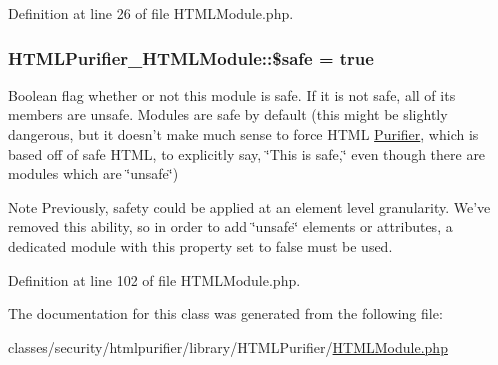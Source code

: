 Definition at line 26 of file H\+T\+M\+L\+Module.\+php.

\hypertarget{classHTMLPurifier__HTMLModule_a2607fc85f803afa801cf1904300644b9}{
\subsubsection[{\$safe}]{\setlength{\rightskip}{0pt plus 5cm}H\+T\+M\+L\+Purifier\+\_\+\+H\+T\+M\+L\+Module\+::\$safe = true}}\label{classHTMLPurifier__HTMLModule_a2607fc85f803afa801cf1904300644b9}
Boolean flag whether or not this module is safe. If it is not safe, all of its members are unsafe. Modules are safe by default (this might be slightly dangerous, but it doesn't make much sense to force H\+T\+M\+L \hyperlink{classPurifier}{Purifier}, which is based off of safe H\+T\+M\+L, to explicitly say, \char`\"{}\+This is safe,\char`\"{} even though there are modules which are \char`\"{}unsafe\char`\"{})

\begin{DoxyNote}{Note}
Previously, safety could be applied at an element level granularity. We've removed this ability, so in order to add \char`\"{}unsafe\char`\"{} elements or attributes, a dedicated module with this property set to false must be used. 
\end{DoxyNote}


Definition at line 102 of file H\+T\+M\+L\+Module.\+php.



The documentation for this class was generated from the following file\+:\begin{DoxyCompactItemize}
\item 
classes/security/htmlpurifier/library/\+H\+T\+M\+L\+Purifier/\hyperlink{HTMLModule_8php}{H\+T\+M\+L\+Module.\+php}\end{DoxyCompactItemize}
